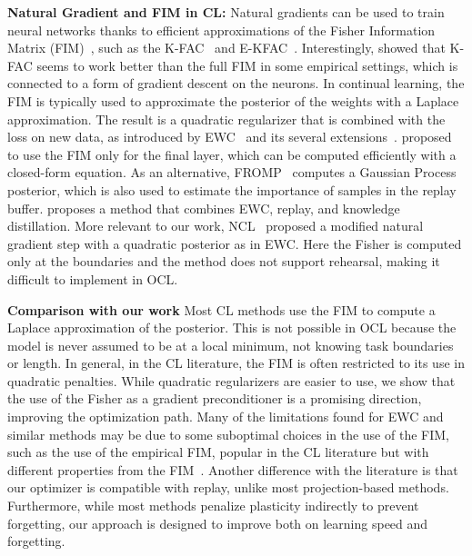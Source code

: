 \textbf{Natural Gradient and FIM in CL:} Natural gradients can be used to train neural networks thanks to efficient approximations of the Fisher Information Matrix (FIM)~\cite{martens2012training}, such as the K-FAC~\cite{martens2020new} and E-KFAC~\cite{DBLP:conf/nips/GeorgeLBBV18}. Interestingly, \citet{DBLP:conf/icml/Benzing22} showed that K-FAC seems to work better than the full FIM in some empirical settings, which is connected to a form of gradient descent on the neurons. In continual learning, the FIM is typically used to approximate the posterior of the weights with a Laplace approximation. The result is a quadratic regularizer that is combined with the loss on new data, as introduced by EWC~\cite{kirkpatrick2017overcoming} and its several extensions~\cite{DBLP:conf/eccv/ChaudhryDAT18,liu2018rotate,DBLP:journals/corr/abs-1712-03847}. \citet{DBLP:conf/iclr/MagistriTS0B24} proposed to use the FIM only for the final layer, which can be computed efficiently with a closed-form equation. As an alternative, FROMP~\cite{pan2020continual} computes a Gaussian Process posterior, which is also used to estimate the importance of samples in the replay buffer. \citet{daxberger2023improving} proposes a method that combines EWC, replay, and knowledge distillation. More relevant to our work, NCL~\cite{DBLP:conf/nips/KaoJVBH21} proposed a modified natural gradient step with a quadratic posterior as in EWC. Here the Fisher is computed only at the boundaries and the method does not support rehearsal, making it difficult to implement in OCL.

\textbf{Comparison with our work} Most CL methods use the FIM to compute a Laplace approximation of the posterior. This is not possible in OCL because the model is never assumed to be at a local minimum, not knowing task boundaries or length. In general, in the CL literature, the FIM is often restricted to its use in quadratic penalties. While quadratic regularizers are easier to use, we show that the use of the Fisher as a gradient preconditioner is a promising direction, improving the optimization path. Many of the limitations found for EWC and similar methods may be due to some suboptimal choices in the use of the FIM, such as the use of the empirical FIM, popular in the CL literature but with different properties from the FIM~\cite{kunstner2019limitations}. Another difference with the literature is that our optimizer is compatible with replay, unlike most projection-based methods. Furthermore, while most methods penalize plasticity indirectly to prevent forgetting, our approach is designed to improve both on learning speed and forgetting.


